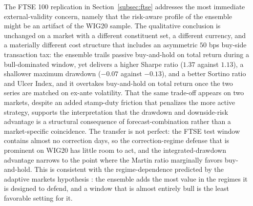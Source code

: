 \documentclass{ieeeaccess}
\newcommand{\FtseMDD}{\ensuremath{-0.07}}
\newcommand{\FtseSharpe}{\ensuremath{1.37}}
\newcommand{\FtseBHmdd}{\ensuremath{-0.13}}
\newcommand{\FtseBHsharpe}{\ensuremath{1.13}}
\begin{document}
The FTSE 100 replication in Section~\ref{subsec:ftse} addresses the most immediate external-validity concern, namely that the risk-aware profile of the ensemble might be an artifact of the WIG20 sample. The qualitative conclusion is unchanged on a market with a different constituent set, a different currency, and a materially different cost structure that includes an asymmetric $50$ bps buy-side transaction tax: the ensemble trails passive buy-and-hold on total return during a bull-dominated window, yet delivers a higher Sharpe ratio (\FtseSharpe{} against \FtseBHsharpe{}), a shallower maximum drawdown (\FtseMDD{} against \FtseBHmdd{}), and a better Sortino ratio and Ulcer Index, and it overtakes buy-and-hold on total return once the two series are matched on ex-ante volatility. That the same trade-off appears on two markets, despite an added stamp-duty friction that penalizes the more active strategy, supports the interpretation that the drawdown and downside-risk advantage is a structural consequence of forecast-combination rather than a market-specific coincidence. The transfer is not perfect: the FTSE test window contains almost no correction days, so the correction-regime defense that is prominent on WIG20 has little room to act, and the integrated-drawdown advantage narrows to the point where the Martin ratio marginally favors buy-and-hold. This is consistent with the regime-dependence predicted by the adaptive markets hypothesis \cite{lo2004}: the ensemble adds the most value in the regimes it is designed to defend, and a window that is almost entirely bull is the least favorable setting for it.
\end{document}
